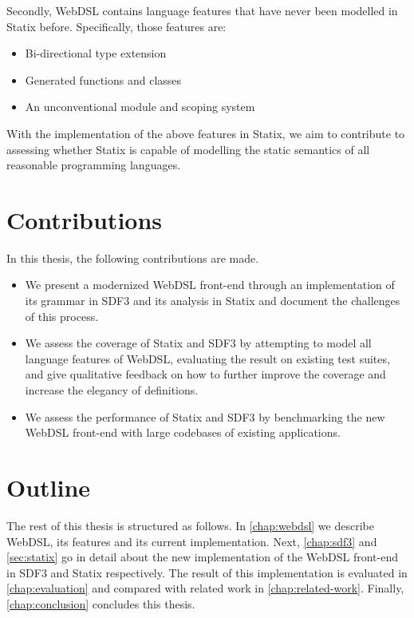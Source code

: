     Secondly, WebDSL contains language features that have never been modelled in Statix before. Specifically, those features are:

    \begin{itemize}
      \item Bi-directional type extension
      \item Generated functions and classes
      \item An unconventional module and scoping system
    \end{itemize}

    With the implementation of the above features in Statix, we aim to contribute to assessing whether Statix is capable of modelling the static semantics of all reasonable programming languages.

  \section{\label{sec:contributions}Contributions}

    In this thesis, the following contributions are made.

    \begin{itemize}
      \item We present a modernized WebDSL front-end through an implementation of its grammar in SDF3 and its analysis in Statix and document the challenges of this process.
      \item We assess the coverage of Statix and SDF3 by attempting to model all language features of WebDSL, evaluating the result on existing test suites, and give qualitative feedback on how to further improve the coverage and increase the elegancy of definitions.
      \item We assess the performance of Statix and SDF3 by benchmarking the new WebDSL front-end with large codebases of existing applications.
    \end{itemize}

  \section{\label{sec:outline}Outline}
    The rest of this thesis is structured as follows. In \cref{chap:webdsl} we describe WebDSL, its features and its current implementation. Next, \cref{chap:sdf3} and \cref{sec:statix} go in detail about the new implementation of the WebDSL front-end in SDF3 and Statix respectively. The result of this implementation is evaluated in \cref{chap:evaluation} and compared with related work in \cref{chap:related-work}. Finally, \cref{chap:conclusion} concludes this thesis.
